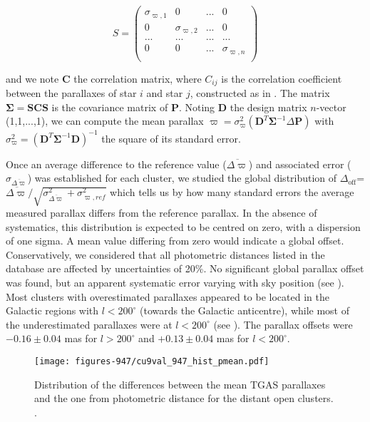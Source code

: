 \begin{equation}
S=
\begin{pmatrix}
  \sigma_{\varpi,1} & 0 & ... & 0 \\
  0 & \sigma_{\varpi,2} & ... & 0 \\
  ... & ... & ... & ... \\
  0 & 0 & ... & \sigma_{\varpi,n} \\
 \end{pmatrix}
\end{equation}

\noindent
and we note $\mathbf{C}$ the correlation matrix, where $C_{ij}$ is the correlation coefficient between the parallaxes of star $i$ and star $j$, constructed as in \citet{2010IAUS..261..320H}. The matrix $\mathbf{\Sigma}=\mathbf{SCS}$ is the covariance matrix of $\mathbf{P}$. Noting $\mathbf{D}$ the design matrix $n$-vector (1,1,...,1), we can compute the mean parallax $\varpi= \sigma^2_{\varpi} (\mathbf{D}^T \mathbf{\Sigma}^{-1} \Delta\mathbf{P}) $ with $\sigma^2_{\varpi}=(\mathbf{D}^T \mathbf{\Sigma}^{-1} \mathbf{D})^{-1}$ the square of its standard error.

Once an average difference to the reference value ($\overline{\Delta\varpi}$) and associated error ($\sigma_{\overline{\Delta\varpi}}$) was established for each cluster, we studied the global distribution of $\Delta_\mathrm{off}$=$\overline{\Delta\varpi} / \sqrt{ \sigma^2_{\overline{\Delta\varpi}} + \sigma^2_{\varpi,ref}}$  which tells us by how many standard errors the average measured parallax differs from the reference parallax. In the absence of systematics, this distribution is expected to be centred on zero, with a dispersion of one sigma. A mean value differing from zero would indicate a global offset. Conservatively, we considered that all photometric distances listed in the \citet{2014A&A...564A..79D} database are affected by uncertainties of 20\%.  No significant global parallax offset was found, but an apparent systematic error varying with sky position (see ). Most clusters with overestimated parallaxes appeared to be located in the Galactic regions with $l<200^{\circ}$ (towards the Galactic anticentre), while most of the underestimated parallaxes were at $l<200^{\circ}$ (see ). The parallax offsets were $-0.16\pm 0.04$ mas for $l>200^{\circ}$ and $+0.13\pm 0.04$ mas for $l<200^{\circ}$.


\begin{figure}
\centering
\texttt{[image: figures-947/cu9val\_947\_hist\_pmean.pdf]}
\caption{Distribution of the differences between the mean TGAS parallaxes and the one from photometric distance for the distant open clusters. 
.} \label{fig:cu9val_947_hist_manual_pmean}
\end{figure}

